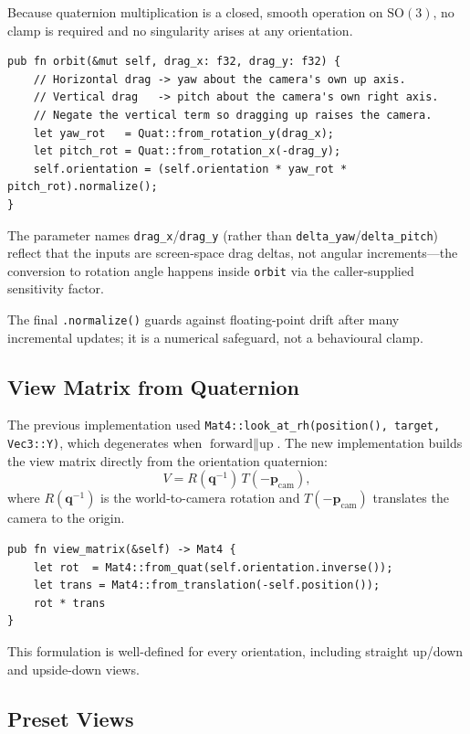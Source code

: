 \documentclass[11pt]{article}
\begin{document}
Because quaternion multiplication is a closed, smooth operation on
$\mathrm{SO}(3)$, no clamp is required and no singularity arises at
any orientation.

\begin{lstlisting}
pub fn orbit(&mut self, drag_x: f32, drag_y: f32) {
    // Horizontal drag -> yaw about the camera's own up axis.
    // Vertical drag   -> pitch about the camera's own right axis.
    // Negate the vertical term so dragging up raises the camera.
    let yaw_rot   = Quat::from_rotation_y(drag_x);
    let pitch_rot = Quat::from_rotation_x(-drag_y);
    self.orientation = (self.orientation * yaw_rot * pitch_rot).normalize();
}
\end{lstlisting}

The parameter names \texttt{drag\_x}/\texttt{drag\_y} (rather than
\texttt{delta\_yaw}/\texttt{delta\_pitch}) reflect that the inputs are
screen-space drag deltas, not angular increments---the conversion to
rotation angle happens inside \texttt{orbit} via the caller-supplied
sensitivity factor.

The final \texttt{.normalize()} guards against floating-point drift
after many incremental updates; it is a numerical safeguard, not a
behavioural clamp.

\subsection{View Matrix from Quaternion}

The previous implementation used
\texttt{Mat4::look\_at\_rh(position(), target, Vec3::Y)}, which
degenerates when $\text{forward} \parallel \text{up}$.  The new
implementation builds the view matrix directly from the orientation
quaternion:
\[
  V = R(\mathbf{q}^{-1}) \, T(-\mathbf{p}_{\text{cam}}),
\]
where $R(\mathbf{q}^{-1})$ is the world-to-camera rotation and
$T(-\mathbf{p}_{\text{cam}})$ translates the camera to the origin.

\begin{lstlisting}
pub fn view_matrix(&self) -> Mat4 {
    let rot  = Mat4::from_quat(self.orientation.inverse());
    let trans = Mat4::from_translation(-self.position());
    rot * trans
}
\end{lstlisting}

This formulation is well-defined for every orientation, including
straight up/down and upside-down views.

\subsection{Preset Views}
\end{document}
